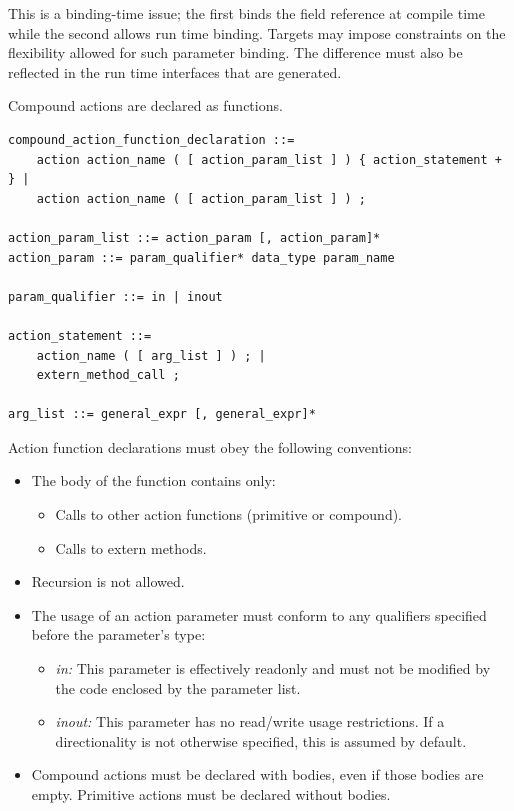 \documentclass[12pt]{article}
\begin{document}
This is a binding-time issue; the first binds the field reference at compile 
time while the second allows run time binding. Targets may impose constraints 
on the flexibility allowed for such parameter binding. The difference must 
also be reflected in the run time interfaces that are generated.


Compound actions are declared as functions.

\begin{lstlisting}[style=BNFstyle]
compound_action_function_declaration ::=
    action action_name ( [ action_param_list ] ) { action_statement + } |
    action action_name ( [ action_param_list ] ) ;

action_param_list ::= action_param [, action_param]*
action_param ::= param_qualifier* data_type param_name

param_qualifier ::= in | inout

action_statement ::= 
    action_name ( [ arg_list ] ) ; |
    extern_method_call ;

arg_list ::= general_expr [, general_expr]*
\end{lstlisting}

Action function declarations must obey the following conventions:

\begin{itemize}
\item
The body of the function contains only:
\begin{itemize}
\item
Calls to other action functions (primitive or compound).
\item
Calls to extern methods.
\end{itemize}
\item
Recursion is not allowed.
\item
The usage of an action parameter must conform to any qualifiers specified
before the parameter's type:
\begin{itemize}
\item
\textit{in:} This parameter is effectively readonly and must not be modified
by the code enclosed by the parameter list.
\item
\textit{inout:} This parameter has no read/write usage restrictions. If a
directionality is not otherwise specified, this is assumed by default.
\end{itemize}
\item
Compound actions must be declared with bodies, even if those bodies are empty.
Primitive actions must be declared without bodies.
\end{itemize}
\end{document}

